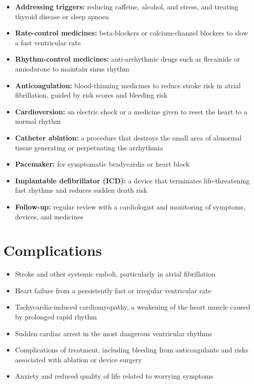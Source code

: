 \begin{itemize}
    \item \textbf{Addressing triggers:} reducing caffeine, alcohol, and stress, and treating thyroid disease or sleep apnoea
    \item \textbf{Rate-control medicines:} beta-blockers or calcium-channel blockers to slow a fast ventricular rate
    \item \textbf{Rhythm-control medicines:} anti-arrhythmic drugs such as flecainide or amiodarone to maintain sinus rhythm
    \item \textbf{Anticoagulation:} blood-thinning medicines to reduce stroke risk in atrial fibrillation, guided by risk scores and bleeding risk
    \item \textbf{Cardioversion:} an electric shock or a medicine given to reset the heart to a normal rhythm
    \item \textbf{Catheter ablation:} a procedure that destroys the small area of abnormal tissue generating or perpetuating the arrhythmia
    \item \textbf{Pacemaker:} for symptomatic bradycardia or heart block
    \item \textbf{Implantable defibrillator (ICD):} a device that terminates life-threatening fast rhythms and reduces sudden death risk
    \item \textbf{Follow-up:} regular review with a cardiologist and monitoring of symptoms, devices, and medicines
\end{itemize}

\section*{Complications}
\begin{itemize}
    \item Stroke and other systemic emboli, particularly in atrial fibrillation
    \item Heart failure from a persistently fast or irregular ventricular rate
    \item Tachycardia-induced cardiomyopathy, a weakening of the heart muscle caused by prolonged rapid rhythm
    \item Sudden cardiac arrest in the most dangerous ventricular rhythms
    \item Complications of treatment, including bleeding from anticoagulants and risks associated with ablation or device surgery
    \item Anxiety and reduced quality of life related to worrying symptoms
\end{itemize}

